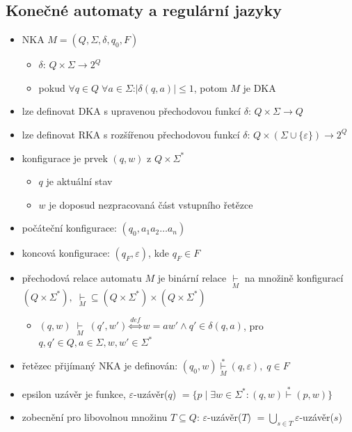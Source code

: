 \documentclass[a4paper, 12pt]{article}
\begin{document}
\subsection{Konečné automaty a regulární jazyky}
\begin{itemize}
	\item NKA $M = (Q, \Sigma, \delta, q_0, F)$
	\begin{itemize}
		\item $\delta$: $Q \times \Sigma \rightarrow 2^Q$
		\item pokud $\forall q \in Q \; \forall a \in \Sigma$:$|\delta(q,a)| \leq 1$, potom $M$ je DKA  
	\end{itemize}
	\item lze definovat DKA s upravenou přechodovou funkcí $\delta$: $Q \times \Sigma \rightarrow Q$
	\item lze definovat RKA s rozšířenou přechodovou funkcí $\delta$: $Q \times (\Sigma \cup \lbrace \varepsilon \rbrace) \rightarrow 2^Q$
	\item konfigurace je prvek $(q,w)$ z $Q \times \Sigma^*$
	\begin{itemize}
		\item $q$ je aktuální stav
		\item $w$ je doposud nezpracovaná část vstupního řetězce
	\end{itemize}
	\item počáteční konfigurace: $(q_0, a_1a_2\ldots a_n)$
	\item koncová konfigurace: $(q_F, \varepsilon)$, kde $q_F \in F$
	\item přechodová relace automatu $M$ je binární relace $\underset{M}{\vdash}$ na množině konfigurací $(Q \times \Sigma^*), \;\underset{M}{\vdash} \subseteq (Q \times \Sigma^*) \times (Q \times \Sigma^*)$
	\begin{itemize}
		\item $(q,w)\;\underset{M}{\vdash}\;(q',w') \overset{def}{\Longleftrightarrow} w = aw' \wedge q' \in \delta(q,a)$, pro $q, q' \in Q, a \in \Sigma, w,w' \in \Sigma^*$
	\end{itemize}
	\item řetězec přijímaný NKA je definován: $(q_0, w) \overset{*}{\underset{M}{\vdash}} (q, \varepsilon), \; q \in F$
	\item epsilon uzávěr je funkce, $\varepsilon$-uzávěr($q$) $ = \lbrace p \;|\; \exists w \in \Sigma^*: (q,w) \overset{*}{\vdash}(p,w) \rbrace$
	\item zobecnění pro libovolnou množinu $T \subseteq Q$: $\varepsilon$-uzávěr($T$) $ = \underset{s \in T}{\bigcup} \varepsilon$-uzávěr($s$)  
\end{itemize}
\end{document}

